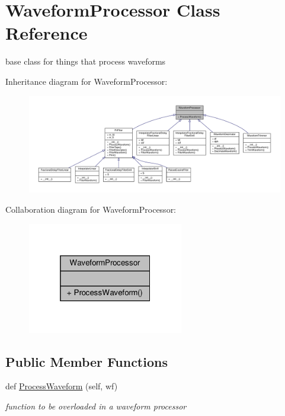 \hypertarget{classSignalIntegrity_1_1TimeDomain_1_1Filters_1_1WaveformProcessor_1_1WaveformProcessor}{}\section{Waveform\+Processor Class Reference}
\label{classSignalIntegrity_1_1TimeDomain_1_1Filters_1_1WaveformProcessor_1_1WaveformProcessor}


base class for things that process waveforms  




Inheritance diagram for Waveform\+Processor\+:\nopagebreak
\begin{figure}[H]
\begin{center}
\leavevmode
\includegraphics[width=350pt]{classSignalIntegrity_1_1TimeDomain_1_1Filters_1_1WaveformProcessor_1_1WaveformProcessor__inherit__graph}
\end{center}
\end{figure}


Collaboration diagram for Waveform\+Processor\+:\nopagebreak
\begin{figure}[H]
\begin{center}
\leavevmode
\includegraphics[width=193pt]{classSignalIntegrity_1_1TimeDomain_1_1Filters_1_1WaveformProcessor_1_1WaveformProcessor__coll__graph}
\end{center}
\end{figure}
\subsection*{Public Member Functions}
\begin{DoxyCompactItemize}
\item 
def \hyperlink{classSignalIntegrity_1_1TimeDomain_1_1Filters_1_1WaveformProcessor_1_1WaveformProcessor_ae09bec195c9cb1d5819e73b7be169b11}{Process\+Waveform} (self, wf)
\begin{DoxyCompactList}\small\item\em function to be overloaded in a waveform processor \end{DoxyCompactList}\end{DoxyCompactItemize}


